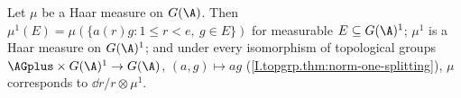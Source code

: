 Let $\mu$ be a Haar measure on $G(\A)$. Then $\mu^1(E)=\mu(\{a(r)g:1\le r<e,\ g\in E\})$ for measurable $E\subseteq G(\A)^1$; $\mu^1$ is a Haar measure on $G(\A)^1$; and under every isomorphism of topological groups $\AGplus\times G(\A)^1\to G(\A)$, $(a,g)\mapsto ag$ (\cref{I.topgrp.thm:norm-one-splitting}), $\mu$ corresponds to $\dd r/r\otimes\mu^1$.

